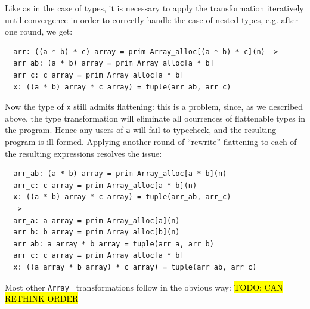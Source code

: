 \documentclass[leqno,11pt]{article}
\begin{document}
Like as in the case of types, it is necessary to apply the transformation
iteratively until convergence in order to correctly handle the case of nested
types, e.g. after one round, we get:
\begin{verbatim}
  arr: ((a * b) * c) array = prim Array_alloc[(a * b) * c](n) ->
  arr_ab: (a * b) array = prim Array_alloc[a * b]
  arr_c: c array = prim Array_alloc[a * b]
  x: ((a * b) array * c array) = tuple(arr_ab, arr_c)
\end{verbatim}
Now the type of \texttt{x} still admits flattening: this is a problem, since, as
we described above, the type transformation will eliminate all ocurrences of
flattenable types in the program. Hence any users of \texttt{a} will fail to
typecheck, and the resulting program is ill-formed. Applying another round of
``rewrite''-flattening to each of the resulting expressions resolves the issue:
\begin{verbatim}
  arr_ab: (a * b) array = prim Array_alloc[a * b](n)
  arr_c: c array = prim Array_alloc[a * b](n)
  x: ((a * b) array * c array) = tuple(arr_ab, arr_c)
  ->
  arr_a: a array = prim Array_alloc[a](n)
  arr_b: b array = prim Array_alloc[b](n)
  arr_ab: a array * b array = tuple(arr_a, arr_b)
  arr_c: c array = prim Array_alloc[a * b]
  x: ((a array * b array) * c array) = tuple(arr_ab, arr_c)
\end{verbatim}
Most other \texttt{Array\_} transformations follow in the obvious way: \hl{TODO: CAN RETHINK ORDER}
\end{document}
